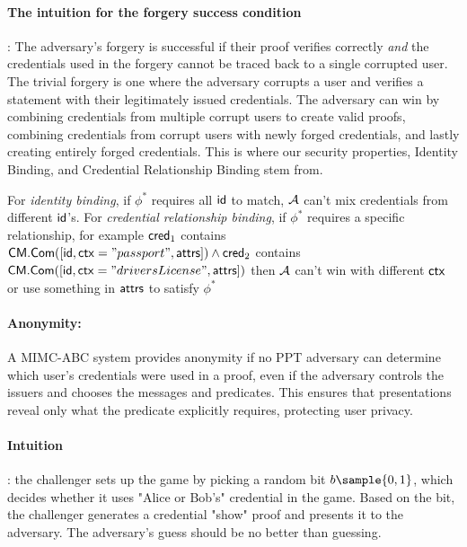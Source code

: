    


\paragraph{The intuition for the forgery success condition}: The adversary's forgery is successful if their proof verifies correctly \emph{and} the credentials used in the forgery cannot be traced back to a single corrupted user. The trivial forgery is one where the adversary corrupts a user and verifies a statement with their legitimately issued credentials. The adversary can win by combining credentials from multiple corrupt users to create valid proofs, combining credentials from corrupt users with newly forged credentials, and lastly creating entirely forged credentials. This is where our security properties, Identity Binding, and Credential Relationship Binding stem from.

\begin{remark}
    For \emph{identity binding}, if $\phi^*$ requires all $\mathsf{id}$ to match, $\mathcal{A}$ can't mix credentials from different $\mathsf{id}$'s. For \emph{credential relationship binding}, if $\phi^*$ requires a specific relationship, for example $\mathsf{cred}_1$ contains $\mathsf{CM.Com}([\mathsf{id}, \mathsf{ctx}="passport", \mathsf{attrs}]) \wedge \mathsf{cred}_2$ contains $\mathsf{CM.Com}([\mathsf{id}, \mathsf{ctx}="driversLicense", \mathsf{attrs}])$ then $\mathcal{A}$ can't win with different $\mathsf{ctx}$ or use something in $\mathsf{attrs}$ to satisfy $\phi^*$
    
\end{remark}

\newpage
\paragraph{Anonymity: }A MIMC-ABC system provides anonymity if no PPT adversary can determine which user’s credentials were used in a proof, even if the adversary controls the issuers and chooses the messages and predicates. This ensures that presentations reveal only what the predicate explicitly requires, protecting user privacy.

\paragraph{Intuition}: the challenger sets up the game by picking a random bit $b \sample \bit$, which decides whether it uses "Alice or Bob's" credential in the game. Based on the bit, the challenger generates a credential "show" proof and presents it to the adversary. The adversary's guess should be no better than guessing.


